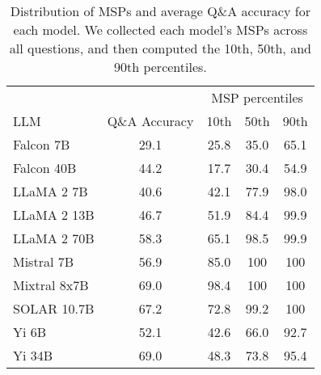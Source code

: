 \begin{table}
\small
\centering
\caption{Distribution of MSPs and average Q\&A accuracy for each model. We collected each model's MSPs across all questions, and then computed the 10th, 50th, and 90th percentiles.}
\label{tab:percentile_conf}
\begin{tabular}{lcccc}
\toprule
& & \multicolumn{3}{c}{MSP percentiles} \\ 
LLM & Q\&A Accuracy & 10th & 50th & 90th\\ 
\cmidrule(lr){1-1} \cmidrule(lr){2-2} \cmidrule(lr){3-5}
Falcon 7B & 29.1 & 25.8 & 35.0 & 65.1\\
Falcon 40B & 44.2 & 17.7 & 30.4 & 54.9\\
LLaMA 2 7B & 40.6 & 42.1 & 77.9 & 98.0\\
LLaMA 2 13B & 46.7 & 51.9 & 84.4 & 99.9\\
LLaMA 2 70B & 58.3 & 65.1 & 98.5 & 99.9\\
Mistral 7B & 56.9 & 85.0 & 100 & 100\\
Mixtral 8x7B & 69.0 & 98.4 & 100 & 100\\
SOLAR 10.7B & 67.2 & 72.8 & 99.2 & 100\\
Yi 6B & 52.1 & 42.6 & 66.0 & 92.7\\
Yi 34B & 69.0 & 48.3 & 73.8 & 95.4\\
\bottomrule
\end{tabular}
\end{table}


